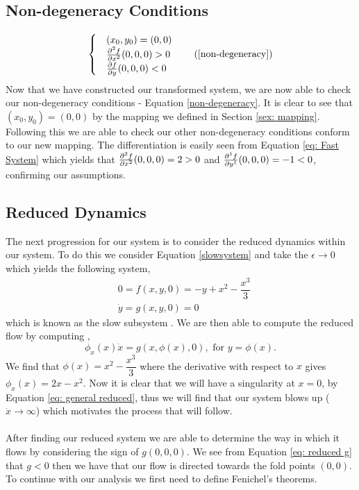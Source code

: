 \documentclass{article}
\newcommand{\folds}{(x_0,y_0)}
\newcommand{\wrt}{with respect to }
\begin{document}
\subsection{Non-degeneracy Conditions}
\begin{equation}
    \begin{cases}
        &\folds=(0,0)\\
        &\pd[2]{f}{x}(0,0,0)>0\\
        &\pd{f}{y}(0,0,0)<0
    \end{cases} 
    \tag{\ref{non-degeneracy}}
\end{equation}
Now that we have constructed our transformed system, we are now able to check our non-degeneracy conditions - Equation \ref{non-degeneracy}. It is clear to see that $\folds=(0,0)$ by the mapping we defined in Section \ref{sex: mapping}. Following this we are able to check our other non-degeneracy conditions conform to our new mapping. The differentiation is easily seen from Equation \ref{eq: Fast System} which yields that $\pd[2]{f}{x}(0,0,0)=2>0$ and $\pd[1]{f}{y}(0,0,0)=-1<0$, confirming our assumptions.


\subsection{Reduced Dynamics}
The next progression for our system is to consider the reduced dynamics within our system. To do this we consider Equation \ref{slowsystem} and take the $\epsilon\to0$ which yields the following system,
\begin{subequations}
    \begin{align}
    &0=f(x,y,0)=-y+x^2-\dfrac{x^3}{3}\\
        &\dot{y}=g(x,y,0)=0 \label{eq: reduced g}
    \end{align}
\end{subequations}
which is known as the slow subsystem \citep{Bible}. We are then able to compute the reduced flow by computing  \citep{krupa2001},
\begin{equation}
    \phi_x(x)\dot{x}=g(x,\phi(x),0),\text{ for }y=\phi(x).
    \label{eq: general reduced}
\end{equation}
We find that $\phi(x)=x^2-\dfrac{x^3}{3}$ where the derivative \wrt $x$ gives $\phi_x(x)=2x-x^2$. Now it is clear that we will have a singularity at $x=0$, by Equation \ref{eq: general reduced}, thus we will find that our system blows up ($\dot{x}\to\infty$) which motivates the process that will follow. \\ \\
After finding our reduced system we are able to determine the way in which it flows by considering the sign of $g(0,0,0)$. We see from Equation \ref{eq: reduced g} that $g<0$ then we have that our flow is directed towards the fold points $(0,0)$. To continue with our analysis we first need to define Fenichel's theorems.
\end{document}
